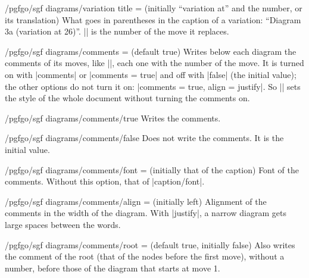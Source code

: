 \begin{key}{/pgfgo/sgf diagrams/variation title =  (initially ``variation at'' and the number, or its translation)}
	What goes in parentheses in the caption of a variation: ``Diagram 3a (variation at 26)''. |\pgfgovariationmove| is the number of the move it replaces.
\end{key}

\begin{key}{/pgfgo/sgf diagrams/comments =  (default true)}
	Writes below each diagram the comments of its moves, like |\sgfcomment|, each one with the number of the move. It is turned on with |comments| or |comments = true| and off with |false| (the initial value); the other options do not turn it on: |comments = {true, align = justify}|. So || sets the style of the whole document without turning the comments on.
\end{key}

\begin{stylekey}{/pgfgo/sgf diagrams/comments/true}
	Writes the comments.
\end{stylekey}
\begin{stylekey}{/pgfgo/sgf diagrams/comments/false}
	Does not write the comments. It is the initial value.
\end{stylekey}

\begin{key}{/pgfgo/sgf diagrams/comments/font =  (initially that of the caption)}
	Font of the comments. Without this option, that of |caption/font|.
\end{key}

\begin{key}{/pgfgo/sgf diagrams/comments/align =  (initially left)}
	Alignment of the comments in the width of the diagram. With |justify|, a narrow diagram gets large spaces between the words.
\end{key}

\begin{key}{/pgfgo/sgf diagrams/comments/root =  (default true, initially false)}
	Also writes the comment of the root (that of the nodes before the first move), without a number, before those of the diagram that starts at move 1.

	\begin{codeexample}
	\end{codeexample}
\end{key}

